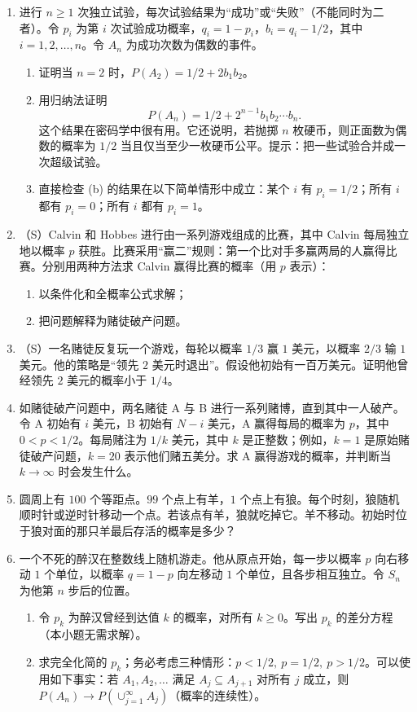 \documentclass[UTF8, 12pt, fontset=fandol, oneside]{ctexart}
\begin{document}
\begin{enumerate}
  \item 进行 $n\ge 1$ 次独立试验，每次试验结果为“成功”或“失败”（不能同时为二者）。令 $p_i$ 为第 $i$ 次试验成功概率，$q_i=1-p_i$，$b_i=q_i-1/2$，其中 $i=1,2,\ldots,n$。令 $A_n$ 为成功次数为偶数的事件。
  \begin{enumerate}
    \item 证明当 $n=2$ 时，$P(A_2)=1/2+2b_1b_2$。
    \item 用归纳法证明
    \[
      P(A_n)=1/2+2^{n-1}b_1b_2\cdots b_n.
    \]
    这个结果在密码学中很有用。它还说明，若抛掷 $n$ 枚硬币，则正面数为偶数的概率为 $1/2$ 当且仅当至少一枚硬币公平。提示：把一些试验合并成一次超级试验。
    \item 直接检查 (b) 的结果在以下简单情形中成立：某个 $i$ 有 $p_i=1/2$；所有 $i$ 都有 $p_i=0$；所有 $i$ 都有 $p_i=1$。
  \end{enumerate}

  \item （S）Calvin 和 Hobbes 进行由一系列游戏组成的比赛，其中 Calvin 每局独立地以概率 $p$ 获胜。比赛采用“赢二”规则：第一个比对手多赢两局的人赢得比赛。分别用两种方法求 Calvin 赢得比赛的概率（用 $p$ 表示）：
  \begin{enumerate}
    \item 以条件化和全概率公式求解；
    \item 把问题解释为赌徒破产问题。
  \end{enumerate}

  \item （S）一名赌徒反复玩一个游戏，每轮以概率 $1/3$ 赢 $1$ 美元，以概率 $2/3$ 输 $1$ 美元。他的策略是“领先 $2$ 美元时退出”。假设他初始有一百万美元。证明他曾经领先 $2$ 美元的概率小于 $1/4$。

  \item 如赌徒破产问题中，两名赌徒 A 与 B 进行一系列赌博，直到其中一人破产。令 A 初始有 $i$ 美元，B 初始有 $N-i$ 美元，A 赢得每局的概率为 $p$，其中 $0<p<1/2$。每局赌注为 $1/k$ 美元，其中 $k$ 是正整数；例如，$k=1$ 是原始赌徒破产问题，$k=20$ 表示他们赌五美分。求 A 赢得游戏的概率，并判断当 $k\to\infty$ 时会发生什么。

  \item 圆周上有 $100$ 个等距点。$99$ 个点上有羊，$1$ 个点上有狼。每个时刻，狼随机顺时针或逆时针移动一个点。若该点有羊，狼就吃掉它。羊不移动。初始时位于狼对面的那只羊最后存活的概率是多少？

  \item 一个不死的醉汉在整数线上随机游走。他从原点开始，每一步以概率 $p$ 向右移动 $1$ 个单位，以概率 $q=1-p$ 向左移动 $1$ 个单位，且各步相互独立。令 $S_n$ 为他第 $n$ 步后的位置。
  \begin{enumerate}
    \item 令 $p_k$ 为醉汉曾经到达值 $k$ 的概率，对所有 $k\ge 0$。写出 $p_k$ 的差分方程（本小题无需求解）。
    \item 求完全化简的 $p_k$；务必考虑三种情形：$p<1/2,\ p=1/2,\ p>1/2$。可以使用如下事实：若 $A_1,A_2,\ldots$ 满足 $A_j\subseteq A_{j+1}$ 对所有 $j$ 成立，则 $P(A_n)\to P(\cup_{j=1}^\infty A_j)$（概率的连续性）。
  \end{enumerate}


\end{enumerate}
\end{document}
